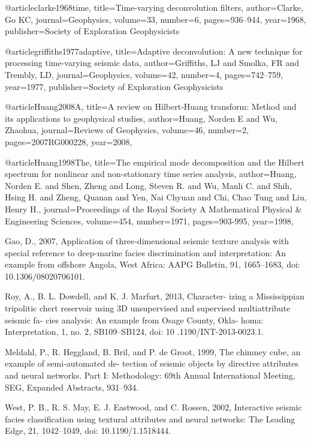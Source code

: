 {@article{clarke1968time,
  title={Time-varying deconvolution filters},
  author={Clarke, Go KC},
  journal={Geophysics},
  volume={33},
  number={6},
  pages={936--944},
  year={1968},
  publisher={Society of Exploration Geophysicists}
}

@article{griffiths1977adaptive,
  title={Adaptive deconvolution: A new technique for processing time-varying seismic data},
  author={Griffiths, LJ and Smolka, FR and Trembly, LD},
  journal={Geophysics},
  volume={42},
  number={4},
  pages={742--759},
  year={1977},
  publisher={Society of Exploration Geophysicists}
}

@article{Huang2008A,
  title={A review on {H}ilbert‐{H}uang transform: {M}ethod and its applications to geophysical studies},
  author={Huang, Norden E and Wu, Zhaohua},
  journal={Reviews of Geophysics},
  volume={46},
  number={2},
  pages={2007RG000228},
  year={2008},
}

@article{Huang1998The,
  title={The empirical mode decomposition and the Hilbert spectrum for nonlinear and non-stationary time series analysis},
  author={Huang, Norden E. and Shen, Zheng and Long, Steven R. and Wu, Manli C. and Shih, Hsing H. and Zheng, Quanan and Yen, Nai Chyuan and Chi, Chao Tung and Liu, Henry H.},
  journal={Proceedings of the Royal Society A Mathematical Physical \& Engineering Sciences},
  volume={454},
  number={1971},
  pages={903-995},
  year={1998},
}

Gao, D., 2007, Application of three-dimensional seismic texture analysis with special reference to deep-marine facies discrimination and interpretation: An example from offshore Angola, West Africa: AAPG Bulletin, 91, 1665–1683, doi: 10.1306/08020706101.

Roy, A., B. L. Dowdell, and K. J. Marfurt, 2013, Character- izing a Mississippian tripolitic chert reservoir using 3{D} unsupervised and supervised multiattribute seismic fa- cies analysis: An example from Osage County, Okla- homa: Interpretation, 1, no. 2, SB109–SB124, doi: 10 .1190/INT-2013-0023.1.

Meldahl, P., R. Heggland, B. Bril, and P. de Groot, 1999, The chimney cube, an example of semi‐automated de- tection of seismic objects by directive attributes and neural networks. Part I: Methodology: 69th Annual International Meeting, SEG, Expanded Abstracts, 931–934.

West, P. B., R. S. May, E. J. Eastwood, and C. Rossen, 2002, Interactive seismic facies classification using textural attributes and neural networks: The Leading Edge, 21, 1042–1049, doi: 10.1190/1.1518444.

}
